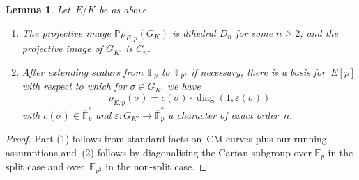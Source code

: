 \documentclass[12pt, reqno]{amsart}
\newcommand{\F}{\mathbb{F}}
\newcommand{\Fp}{\mathbb{F}_p}
\newcommand{\PP}{\mathbb{P}}
\newcommand{\rhobar}{{\overline{\rho}}}
\newcommand{\eps}{\varepsilon}
\newcommand{\diag}{{\operatorname{diag}}}
\numberwithin{equation}{section}
\newtheorem{lemma}[theorem]{Lemma}
\theoremstyle{definition}
\theoremstyle{remark}
\begin{document}
\begin{lemma} \label{L:diagonalC}
Let~$E/K$ be as above. 
\begin{enumerate}
  \item
The projective image $\PP\rhobar_{E,p}(G_K)$ is dihedral $D_n$ for
some $n\ge2$, and the projective image of $G_{K'}$ is $C_n$.
\item
After extending scalars from~$\Fp$ to~$\F_{p^2}$ if necessary, there
is a basis for~$E[p]$ with respect to which for $\sigma\in G_{K'}$ we
have
\begin{equation}
 \label{E:diagonalC}
\rhobar_{E,p}(\sigma) = c(\sigma)\cdot\diag(1,\eps(\sigma))
\end{equation}
with $c(\sigma)\in\overline{\F}_p^*$ and
$\eps:G_{K'}\to\overline{\F}_p^*$ a character of exact order~$n$.
\end{enumerate}
\end{lemma}
\begin{proof}
Part (1) follows from standard facts on~CM curves plus our running
assumptions and~(2) follows by diagonalising the Cartan subgroup over $\Fp$ in
  the split case and over~$\F_{p^2}$ in the non-split case.
\end{proof}
\end{document}
